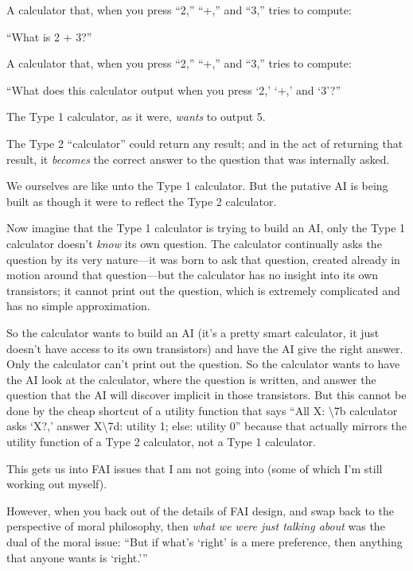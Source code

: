 {
 A calculator that, when you press
``2,''
``+,'' and
``3,'' tries to compute:}

{
 ``What is 2 + 3?''}

{
 A calculator that, when you press
``2,''
``+,'' and
``3,'' tries to compute:}

{
 ``What does this calculator output when you press
`2,' `+,'
and `3'?''}

{
 The Type 1 calculator, as it were, \textit{wants} to output 5.}

{
 The Type 2 ``calculator'' could
return any result; and in the act of returning that result, it
\textit{becomes} the correct answer to the question that was internally
asked.}

{
 We ourselves are like unto the Type 1 calculator. But the putative
AI is being built as though it were to reflect the Type 2 calculator.}

{
 Now imagine that the Type 1 calculator is trying to build an AI,
only the Type 1 calculator doesn't \textit{know} its
own question. The calculator continually asks the question by its very
nature---it was born to ask that question, created already in motion
around that question---but the calculator has no insight into its own
transistors; it cannot print out the question, which is extremely
complicated and has no simple approximation.}

{
 So the calculator wants to build an AI (it's a
pretty smart calculator, it just doesn't have access to
its own transistors) and have the AI give the right answer. Only the
calculator can't print out the question. So the
calculator wants to have the AI look at the calculator, where the
question is written, and answer the question that the AI will discover
implicit in those transistors. But this cannot be done by the cheap
shortcut of a utility function that says ``All X:
{\textbackslash}{\textquotesingle}7b calculator asks
`X?,' answer
X{\textbackslash}{\textquotesingle}7d: utility 1; else: utility
0'' because that actually mirrors the utility
function of a Type 2 calculator, not a Type 1 calculator.}

{
 This gets us into FAI issues that I am not going into (some of
which I'm still working out myself).}

{
 However, when you back out of the details of FAI design, and swap
back to the perspective of moral philosophy, then \textit{what we were
just talking about} was the dual of the moral issue:
``But if what's
`right' is a mere preference, then
anything that anyone wants is
`right.'''}

